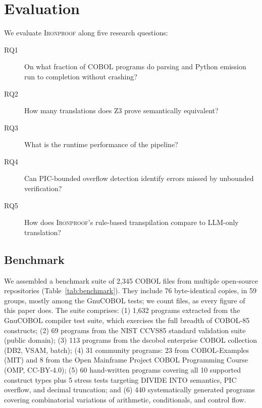 \documentclass[sigconf,nonacm]{acmart}
\begin{document}
\section{Evaluation}\label{sec:evaluation}

We evaluate \textsc{Ironproof} along five research questions:

\begin{description}
  \item[RQ1] On what fraction of COBOL programs do parsing and Python emission run to completion without crashing?
  \item[RQ2] How many translations does Z3 prove semantically equivalent?
  \item[RQ3] What is the runtime performance of the pipeline?
  \item[RQ4] Can PIC-bounded overflow detection identify errors missed by unbounded verification?
  \item[RQ5] How does \textsc{Ironproof}'s rule-based transpilation compare to LLM-only translation?
\end{description}

\subsection{Benchmark}\label{sec:benchmark}

We assembled a benchmark suite of 2{,}345 COBOL files from multiple open-source repositories (Table~\ref{tab:benchmark}). They include 76 byte-identical copies, in 59 groups, mostly among the GnuCOBOL tests; we count files, as every figure of this paper does. The suite comprises: (1) 1{,}632 programs extracted from the GnuCOBOL compiler test suite, which exercises the full breadth of COBOL-85 constructs; (2) 69 programs from the NIST CCVS85 standard validation suite~\cite{nist1985cobol} (public domain); (3) 113 programs from the dscobol enterprise COBOL collection (DB2, VSAM, batch); (4) 31 community programs: 23 from COBOL-Examples (MIT) and 8 from the Open Mainframe Project COBOL Programming Course (OMP, CC-BY-4.0); (5) 60 hand-written programs covering all 10 supported construct types plus 5 stress tests targeting DIVIDE INTO semantics, PIC overflow, and decimal truncation; and (6) 440 systematically generated programs covering combinatorial variations of arithmetic, conditionals, and control flow.
\end{document}
